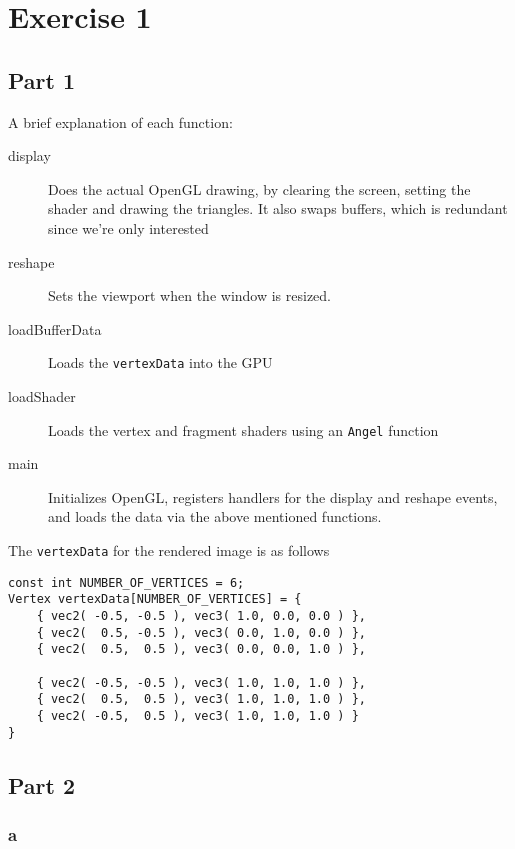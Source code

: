 \section{Exercise 1}
\subsection{Part 1}

A brief explanation of each function:

\begin{description}
\item [display] Does the actual OpenGL drawing, by clearing the screen, setting the shader and drawing the triangles. It also swaps buffers, which is redundant since we're only interested

\item [reshape] Sets the viewport when the window is resized.

\item[loadBufferData] Loads the \texttt{vertexData} into the GPU

\item[loadShader] Loads the vertex and fragment shaders using an
  \texttt{Angel} function

\item[main] Initializes OpenGL, registers handlers for the display and reshape events, and loads the data via the above mentioned functions.

\end{description}
The \texttt{vertexData} for the rendered image is as follows

\begin{lstlisting}
const int NUMBER_OF_VERTICES = 6;
Vertex vertexData[NUMBER_OF_VERTICES] = {
	{ vec2( -0.5, -0.5 ), vec3( 1.0, 0.0, 0.0 ) },
	{ vec2(  0.5, -0.5 ), vec3( 0.0, 1.0, 0.0 ) },
	{ vec2(  0.5,  0.5 ), vec3( 0.0, 0.0, 1.0 ) },

	{ vec2( -0.5, -0.5 ), vec3( 1.0, 1.0, 1.0 ) },
	{ vec2(  0.5,  0.5 ), vec3( 1.0, 1.0, 1.0 ) },
	{ vec2( -0.5,  0.5 ), vec3( 1.0, 1.0, 1.0 ) }
}
\end{lstlisting}

\subsection{Part 2}

\subsubsection{a}

